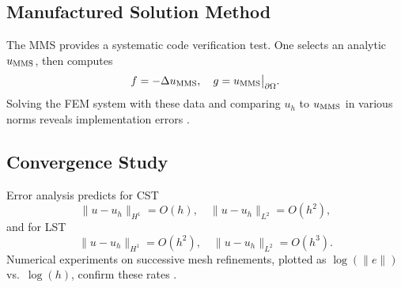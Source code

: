 \subsection{Manufactured Solution Method}

The MMS provides a systematic code verification test.  One selects an analytic $u_{\rm MMS}$, then computes
\begin{equation}
  f=-\Delta u_{\rm MMS},
  \quad
  g=u_{\rm MMS}\big|_{\partial\Omega}.
\end{equation}
Solving the FEM system with these data and comparing $u_h$ to $u_{\rm MMS}$ in various norms reveals implementation errors \cite{Method_of_manufactured_solutions}.

\subsection{Convergence Study}

Error analysis predicts for CST
\begin{equation}
  \|u-u_h\|_{H^1}=O(h),
  \quad
  \|u-u_h\|_{L^2}=O(h^2),
\end{equation}
and for LST
\begin{equation}
  \|u-u_h\|_{H^1}=O(h^2),
  \quad
  \|u-u_h\|_{L^2}=O(h^3).
\end{equation}
Numerical experiments on successive mesh refinements, plotted as $\log(\|e\|)$ vs.\ $\log(h)$, confirm these rates \cite{Convergence_numerical_analysis}.
